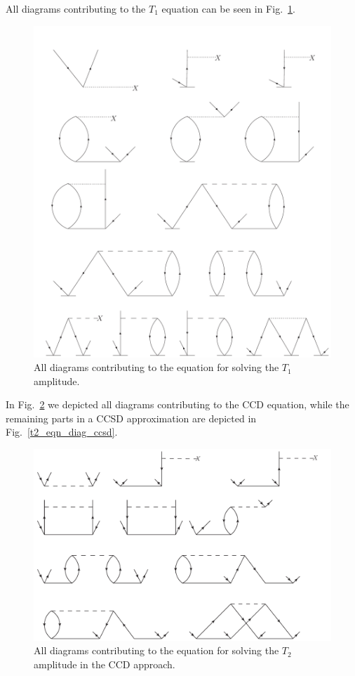 All diagrams contributing to the $T_1$ equation can be seen in Fig.~\ref{t1_eqn_diag}.\\
\begin{figure}[htp]
\centering
\includegraphics[scale=0.25]{t1_eqn_diag}
\caption{All diagrams contributing to the equation for solving the
$T_1$ amplitude.}
\label{t1_eqn_diag}
\end{figure}
In Fig.~\ref{t2_eqn_diag} we depicted all diagrams contributing to the CCD equation, while the remaining parts in a CCSD approximation are depicted in 
Fig.~\ref{t2_eqn_diag_ccsd}.  
\begin{figure}[htp]
\centering
\includegraphics[scale=0.5]{t2_eqn_diag}%
\caption{All diagrams contributing to the equation for solving the
$T_2$ amplitude in the CCD approach.}
\label{t2_eqn_diag}
\end{figure}
